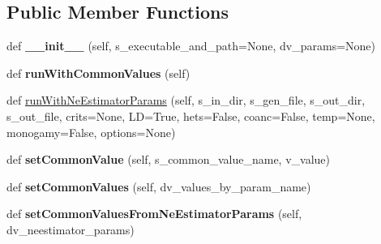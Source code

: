 \subsection*{Public Member Functions}
\begin{DoxyCompactItemize}
\item 
def {\bfseries \+\_\+\+\_\+init\+\_\+\+\_\+} (self, s\+\_\+executable\+\_\+and\+\_\+path=None, dv\+\_\+params=None)\hypertarget{classnegui_1_1pgldne2controller_1_1PGLDNe2Controller_a1f021499dd715ba16eee893c7d904059}{}\label{classnegui_1_1pgldne2controller_1_1PGLDNe2Controller_a1f021499dd715ba16eee893c7d904059}

\item 
def {\bfseries run\+With\+Common\+Values} (self)\hypertarget{classnegui_1_1pgldne2controller_1_1PGLDNe2Controller_a1b95e9adb250015f53209507fd315e51}{}\label{classnegui_1_1pgldne2controller_1_1PGLDNe2Controller_a1b95e9adb250015f53209507fd315e51}

\item 
def \hyperlink{classnegui_1_1pgldne2controller_1_1PGLDNe2Controller_aed495f4f2eed9691295b239e6dcf16ba}{run\+With\+Ne\+Estimator\+Params} (self, s\+\_\+in\+\_\+dir, s\+\_\+gen\+\_\+file, s\+\_\+out\+\_\+dir, s\+\_\+out\+\_\+file, crits=None, LD=True, hets=False, coanc=False, temp=None, monogamy=False, options=None)
\item 
def {\bfseries set\+Common\+Value} (self, s\+\_\+common\+\_\+value\+\_\+name, v\+\_\+value)\hypertarget{classnegui_1_1pgldne2controller_1_1PGLDNe2Controller_a5ee0c7f2d6e24e61aab72001c5ff42ee}{}\label{classnegui_1_1pgldne2controller_1_1PGLDNe2Controller_a5ee0c7f2d6e24e61aab72001c5ff42ee}

\item 
def {\bfseries set\+Common\+Values} (self, dv\+\_\+values\+\_\+by\+\_\+param\+\_\+name)\hypertarget{classnegui_1_1pgldne2controller_1_1PGLDNe2Controller_a6e7ba348c191706f364f1d9eb2bed120}{}\label{classnegui_1_1pgldne2controller_1_1PGLDNe2Controller_a6e7ba348c191706f364f1d9eb2bed120}

\item 
def {\bfseries set\+Common\+Values\+From\+Ne\+Estimator\+Params} (self, dv\+\_\+neestimator\+\_\+params)\hypertarget{classnegui_1_1pgldne2controller_1_1PGLDNe2Controller_a3db1e4decab081138dc09c6302c79b18}{}\label{classnegui_1_1pgldne2controller_1_1PGLDNe2Controller_a3db1e4decab081138dc09c6302c79b18}

\end{DoxyCompactItemize}


